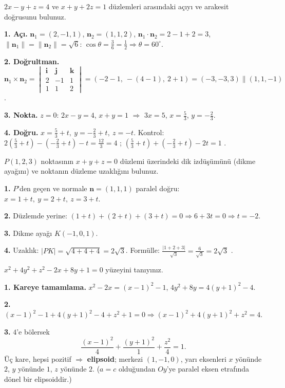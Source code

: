 \begin{soru}
$2x-y+z=4$ ve $x+y+2z=1$ düzlemleri arasındaki açıyı ve arakesit doğrusunu bulunuz.
\end{soru}
\begin{cevap}
\textbf{1. Açı.} $\mathbf n_1=(2,-1,1)$, $\mathbf n_2=(1,1,2)$, $\mathbf n_1\cdot\mathbf n_2=2-1+2=3$, $\|\mathbf n_1\|=\|\mathbf n_2\|=\sqrt6$:
$\cos\theta=\frac{3}{6}=\frac12\Rightarrow\theta=60^\circ$.

\textbf{2. Doğrultman.}
$\mathbf n_1\times\mathbf n_2=\begin{vmatrix}\mathbf i&\mathbf j&\mathbf k\\2&-1&1\\1&1&2\end{vmatrix}=(-2-1,\ -(4-1),\ 2+1)=(-3,-3,3)\parallel(1,1,-1)$.

\textbf{3. Nokta.} $z=0$: $2x-y=4$, $x+y=1$ $\Rightarrow$ $3x=5$, $x=\frac53$, $y=-\frac23$.

\textbf{4. Doğru.} $x=\frac53+t,\ y=-\frac23+t,\ z=-t$. Kontrol: $2(\frac53+t)-(-\frac23+t)-t=\frac{12}{3}=4$ \checkmark; $(\frac53+t)+(-\frac23+t)-2t=1$ \checkmark.
\end{cevap}

\begin{soru}
$P(1,2,3)$ noktasının $x+y+z=0$ düzlemi üzerindeki dik izdüşümünü (dikme ayağını) ve noktanın düzleme uzaklığını bulunuz.
\end{soru}
\begin{cevap}
\textbf{1.} $P$'den geçen ve normale $\mathbf n=(1,1,1)$ paralel doğru: $x=1+t,\ y=2+t,\ z=3+t$.

\textbf{2.} Düzlemde yerine: $(1+t)+(2+t)+(3+t)=0\Rightarrow6+3t=0\Rightarrow t=-2$.

\textbf{3.} Dikme ayağı $K(-1,0,1)$.

\textbf{4.} Uzaklık: $|PK|=\sqrt{4+4+4}=2\sqrt3$. Formülle: $\frac{|1+2+3|}{\sqrt3}=\frac{6}{\sqrt3}=2\sqrt3$ \checkmark.
\end{cevap}

\begin{soru}
$x^2+4y^2+z^2-2x+8y+1=0$ yüzeyini tanıyınız.
\end{soru}
\begin{cevap}
\textbf{1. Kareye tamamlama.} $x^2-2x=(x-1)^2-1$, $4y^2+8y=4(y+1)^2-4$.

\textbf{2.} $(x-1)^2-1+4(y+1)^2-4+z^2+1=0\Rightarrow(x-1)^2+4(y+1)^2+z^2=4$.

\textbf{3.} $4$'e bölersek
\[ \frac{(x-1)^2}{4}+\frac{(y+1)^2}{1}+\frac{z^2}{4}=1 . \]
Üç kare, hepsi pozitif $\Rightarrow$ \textbf{elipsoid}; merkezi $(1,-1,0)$, yarı eksenleri $x$ yönünde $2$, $y$ yönünde $1$, $z$ yönünde $2$. ($a=c$ olduğundan $Oy$'ye paralel eksen etrafında dönel bir elipsoiddir.)
\end{cevap}

